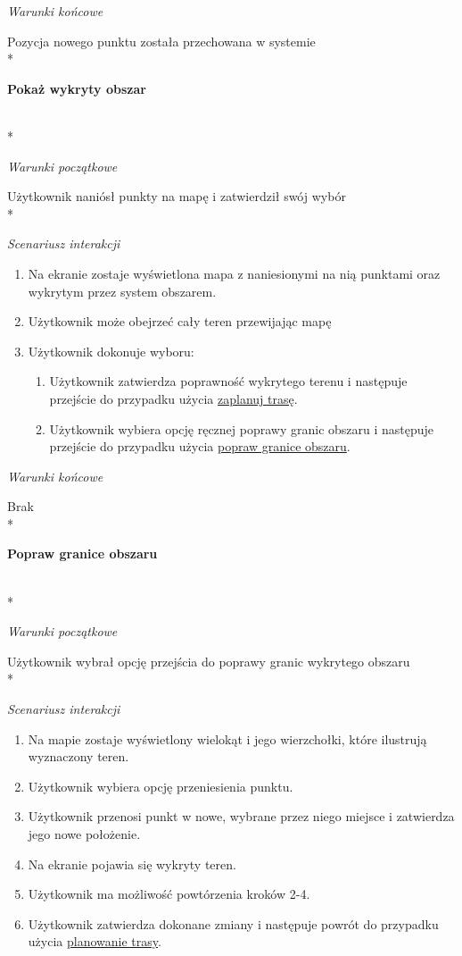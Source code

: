 \vspace{\baselineskip}
\textit{Warunki końcowe}

Pozycja nowego punktu została przechowana w systemie \\*

\hypertarget{show detected area}{\textbf{Pokaż wykryty obszar}} \\*

\textit{Warunki początkowe}

Użytkownik naniósł punkty na mapę i zatwierdził swój wybór \\*

\textit{Scenariusz interakcji}
\begin{enumerate}[label=\arabic*.,ref=\arabic*]
    \item Na ekranie zostaje wyświetlona mapa z naniesionymi na nią punktami oraz wykrytym przez system obszarem.
    \item Użytkownik może obejrzeć cały teren przewijając mapę
    \item Użytkownik dokonuje wyboru:
    \begin{enumerate}[label=\arabic{enumi}.\arabic*.,ref=\arabic{enumi}.\arabic*]
        \item Użytkownik zatwierdza poprawność wykrytego terenu i następuje przejście do przypadku użycia \hyperlink{plan route}{zaplanuj trasę}.
        \item Użytkownik wybiera opcję ręcznej poprawy granic obszaru i następuje przejście do przypadku użycia \hyperlink{change area border}{popraw granice obszaru}.
    \end{enumerate}
\end{enumerate}

\vspace{\baselineskip}
\textit{Warunki końcowe}

Brak \\*

\hypertarget{change area border}{\textbf{Popraw granice obszaru}} \\*

\textit{Warunki początkowe}

Użytkownik wybrał opcję przejścia do poprawy granic wykrytego obszaru \\*

\textit{Scenariusz interakcji}
\begin{enumerate}
    \item Na mapie zostaje wyświetlony wielokąt i jego wierzchołki, które ilustrują wyznaczony teren.
    \item Użytkownik wybiera opcję przeniesienia punktu.
    \item Użytkownik przenosi punkt w nowe, wybrane przez niego miejsce i zatwierdza jego nowe położenie.
    \item Na ekranie pojawia się wykryty teren.
    \item Użytkownik ma możliwość powtórzenia kroków 2-4.
    \item Użytkownik zatwierdza dokonane zmiany i następuje powrót do przypadku użycia \hyperlink{plan route}{planowanie trasy}.
\end{enumerate}

